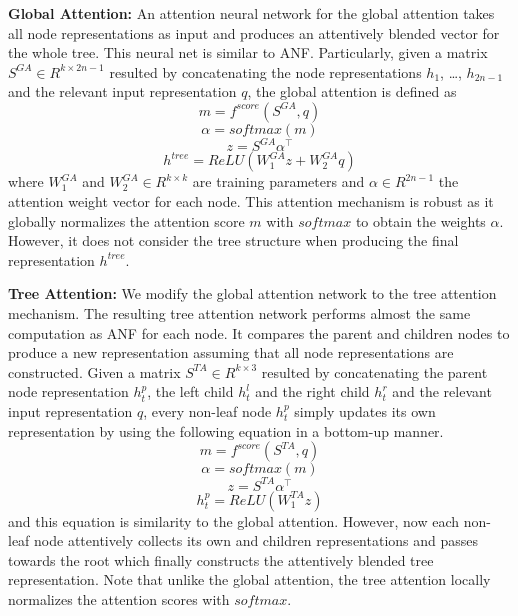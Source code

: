 \documentclass[11pt]{article}
\begin{document}
\textbf{Global Attention:} An attention neural network for the global attention takes all node representations as input and produces an attentively blended vector for the whole tree. This neural net is similar to ANF. Particularly, given a matrix $S^{GA} \in R^{k \times 2n-1}$ resulted by concatenating the node representations $h_1$, \ldots, $h_{2n-1}$ and the relevant input representation $q$, the global attention is defined as 
\begin{equation}
m=f^{score} (S^{GA}, q)
\end{equation}
\begin{equation}
\alpha=softmax(m)
\end{equation}
\begin{equation}
z=S^{GA} \alpha ^{\top}
\end{equation}
\begin{equation}
h^{tree}=ReLU (W^{GA}_1 z + W^{GA}_2 q)
\end{equation}
where $W^{GA}_1$ and $W^{GA}_2 \in R^{k \times k}$ are training parameters and $\alpha \in R^{2n-1}$ the attention weight vector for each node. This attention mechanism is robust as it globally normalizes the attention score $m$ with $softmax$ to obtain the weights $\alpha$. However, it does not consider the tree structure when producing the final representation $h^{tree}$.

\textbf{Tree Attention:} We modify the global attention network to the tree attention mechanism. The resulting tree attention network performs almost the same computation as ANF for each node. It compares the parent and children nodes to produce a new representation assuming that all node representations are constructed. Given a matrix $S^{TA} \in R^{k \times 3}$ resulted by concatenating the parent node representation $h^p_t$, the left child $h^l_t$ and the right child $h^r_t$ and the relevant input representation $q$, every non-leaf node $h^p_t$ simply updates its own representation by using the following equation in a bottom-up manner.
\begin{equation}
m=f^{score} (S^{TA}, q)
\end{equation}
\begin{equation}
\alpha=softmax(m)
\end{equation}
\begin{equation}
z=S^{TA} \alpha ^{\top}
\end{equation}
\begin{equation}
h^{p}_{t}=ReLU (W^{TA}_1 z)
\end{equation}
and this equation is similarity to the global attention. However, now each non-leaf node attentively collects its own and children representations and passes towards the root which finally constructs the attentively blended tree representation. Note that unlike the global attention, the tree attention locally normalizes the attention scores with $softmax$.
\end{document}
